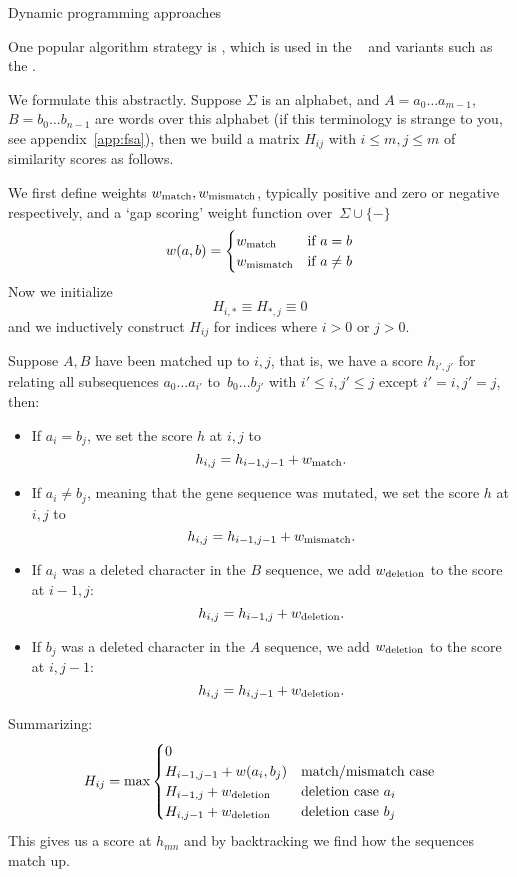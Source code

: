  {Dynamic programming approaches}
\label{sec:smithwaterman}

One popular  algorithm strategy is
, which is used in the
~\cite{NeedlemanWunsch}
and variants such as the
.

We formulate this abstractly. Suppose $\Sigma$ is an alphabet, 
and $A=a_0\ldots a_{m-1}$, $B=b_0\ldots b_{n-1}$ are words over this alphabet
(if this terminology is strange to you, see appendix~\ref{app:fsa}),
then we build a matrix $H_{ij}$ with $i\leq m, j\leq m$
of similarity scores as follows.



We first define weights $w_{\mathrm{match}},w_{\mathrm{mismatch}}$, typically positive and zero or negative 
respectively, and a `gap scoring' weight function over~$\Sigma\cup\{-\}$
\[ w(a,b)=
\begin{cases}
  w_{\mathrm{match}}&\hbox{if $a=b$}\\ w_{\mathrm{mismatch}}&\hbox{if $a\not=b$}
\end{cases}
\]
Now we initialize
\[ H_{i,*}\equiv H_{*,j}\equiv 0 \]
and we inductively construct $H_{ij}$ for indices where $i>0$ or $j>0$.

Suppose $A,B$ have been matched up to $i,j$, that is, 
we have a score $h_{i',j'}$
for relating all subsequences
$a_0\ldots a_{i'}$ to~$b_0\ldots b_{j'}$ with $i'\leq i,j'\leq j$
except $i'=i,j'=j$, then:
\begin{itemize}
\item If $a_i=b_j$, we set the score $h$ at $i,j$ to
  \[ h_{i,j} = h_{i-1,j-1}+w_{\mathrm{match}}. \]
\item If $a_i\not=b_j$, meaning that the gene sequence was mutated,
  we set the score $h$ at $i,j$ to
  \[ h_{i,j} = h_{i-1,j-1}+w_{\mathrm{mismatch}}. \]
\item If $a_i$ was a deleted character in the $B$ sequence,
  we add $w_{\mathrm{deletion}}$ to the score at $i-1,j$:
  \[ h_{i,j} = h_{i-1,j}+w_{\mathrm{deletion}}. \]
\item If $b_j$ was a deleted character in the $A$ sequence,
  we add $w_{\mathrm{deletion}}$ to the score at $i,j-1$:
  \[ h_{i,j} = h_{i,j-1}+w_{\mathrm{deletion}}. \]
\end{itemize}
Summarizing:
\[ H_{ij} = \max
\begin{cases}
  0\\
  H_{i-1,j-1}+w(a_i,b_j)&\hbox{match/mismatch case}\\
  H_{i-1,j}+w_{\mathrm{deletion}}       &\hbox{deletion case $a_i$}\\
  H_{i,j-1}+w_{\mathrm{deletion}}       &\hbox{deletion case $b_j$}\\
\end{cases}
\]
This gives us a score at $h_{mn}$ and by backtracking we find
how the sequences match up.

